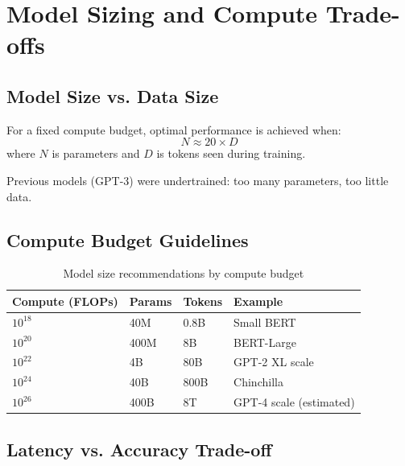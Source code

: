 \section{Model Sizing and Compute Trade-offs}
\label{sec:model_sizing}

\subsection{Model Size vs. Data Size}

\begin{keyinsight}
For a fixed compute budget, optimal performance is achieved when:
\begin{equation}
N \approx 20 \times D
\end{equation}
where $N$ is parameters and $D$ is tokens seen during training.

Previous models (GPT-3) were undertrained: too many parameters, too little data.
\end{keyinsight}

\subsection{Compute Budget Guidelines}

\begin{table}[H]
\centering
\caption{Model size recommendations by compute budget}
\begin{tabularx}{\textwidth}{lXXX}
\toprule
\textbf{Compute (FLOPs)} & \textbf{Params} & \textbf{Tokens} & \textbf{Example} \\
\midrule
$10^{18}$ & 40M & 0.8B & Small BERT \\
$10^{20}$ & 400M & 8B & BERT-Large \\
$10^{22}$ & 4B & 80B & GPT-2 XL scale \\
$10^{24}$ & 40B & 800B & Chinchilla \\
$10^{26}$ & 400B & 8T & GPT-4 scale (estimated) \\
\bottomrule
\end{tabularx}
\end{table}

\subsection{Latency vs. Accuracy Trade-off}


